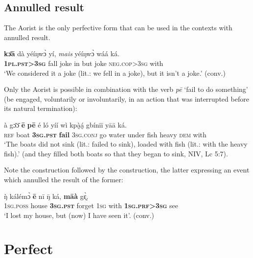 \documentclass[output=paper,newtxmath,modfonts,nonflat,hidelinks]{langsci/langscibook}
\begin{document}
\subsection{Annulled result}
\label{khachsectanres}
The Aorist is the only perfective form that can be used in the contexts with annulled result.

\begin{exe} \ex
\gll \textbf{kɔ̄ā}	dà	yéíŋwɔ̀	yí,	\textit{mais}	yéíŋwɔ̀	wáá	ká.	\\
\textbf{1\textsc{pl}.\textsc{pst}>3\textsc{sg}}	fall	joke	in	but	joke	\textsc{neg.cop}>3\textsc{sg}	with	 \\
\glt ‘We considered it a joke (lit.: we fell in a joke), but it isn’t a joke.’ (conv.)
\end{exe}

Only the Aorist is possible in combination with the verb \textit{pē} ‘fail to do something’ (be engaged, voluntarily or involuntarily, in an action that was interrupted before its natural termination):

\begin{exe} \ex
\gll	à	gɔ̄ɔ̄	\textbf{ē}	\textbf{pē}	é	ló	yíí	wì	kpà̰á̰	gbínīī	yāā	ká.\\
	\textsc{ref}	boat	\textbf{3\textsc{sg}.\textsc{pst}}	\textbf{fail}	3\textsc{sg}.\textsc{conj}	go	water	under	fish	heavy	\textsc{dem}	with\\
\glt ‘The boats did not sink (lit.: failed to sink), loaded with fish (lit.: with the heavy fish).' (and they filled both boats so that they began to sink, NIV, Lc 5:7). 
\end{exe}

Note the  construction followed by the  construction, the latter expressing an event which annulled the result of the former:

\begin{exe} \ex
\gll ŋ̀	kálémɔ̀	\textbf{ē}	nī	ŋ̄	ká,	\textbf{māà}	gɛ̰̀. \\
	1\textsc{sg}.\textsc{poss}	house	\textbf{3\textsc{sg}.\textsc{pst}}	forget	1\textsc{sg}	with	\textbf{1\textsc{sg}.\textsc{prf}>3\textsc{sg}}	see\\
\glt `I lost my house, but (now) I have seen it'. (conv.)
\end{exe}

\section{Perfect}
\label{khachsprf}
\end{document}
